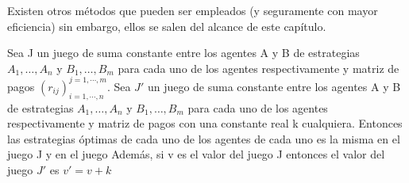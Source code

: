 Existen otros métodos que pueden ser empleados (y seguramente con mayor eficiencia) sin embargo, ellos se salen del alcance de este capítulo.

\begin{proposicion}
Sea J un juego de suma constante entre los agentes A y B de estrategias $A_1,\ldots,A_n$ y $B_1,\ldots,B_m$ para cada uno de los agentes respectivamente y matriz de pagos $\left( r_{ij}\right)_{i=1, \cdots ,n}^{j=1, \cdots, m}$. Sea $J'$ un juego de suma constante entre los agentes A y B de estrategias $A_1,\ldots,A_n$ y $B_1,\ldots,B_m$ para cada uno de los agentes respectivamente y matriz de pagos con una constante real k cualquiera. Entonces las estrategias óptimas de cada uno de los agentes de cada uno es la misma en el juego J y en el juego  Además, si v es el valor del juego J entonces el valor del juego $J'$ es $v' = v+k$
\end{proposicion}

